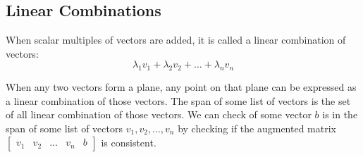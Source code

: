 \documentclass{article}
\theoremstyle{mytheoremstyle}
\theoremstyle{mytheoremstyle}
\theoremstyle{myproblemstyle}
\begin{document}
    \subsection*{Linear Combinations}
    When scalar multiples of vectors are added, it is called a linear
    combination of vectors:
    \begin{equation*}
        \lambda_1 v_1 + \lambda_2 v_2 + \dots + \lambda_n v_n
    \end{equation*}

    When any two vectors form a plane, any point on that plane can be expressed
    as a linear combination of those vectors. The span of some list of vectors
    is the set of all linear combination of those vectors. We can check of some
    vector $b$ is in the span of some list of vectors $v_1,v_2,\dots,v_n$ by
    checking if the augmented matrix $\begin{bmatrix} v_1 & v_2 & \dots & v_n &
    b \end{bmatrix}$ is consistent.
    
\end{document}
